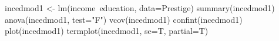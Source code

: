 \begin{Schunk}
\begin{Sinput}
 incedmod1 <- lm(income~education, data=Prestige)
 summary(incedmod1)
 anova(incedmod1, test="F")
 vcov(incedmod1)
 confint(incedmod1)
 plot(incedmod1)
 termplot(incedmod1, se=T, partial=T)
\end{Sinput}
\end{Schunk}
